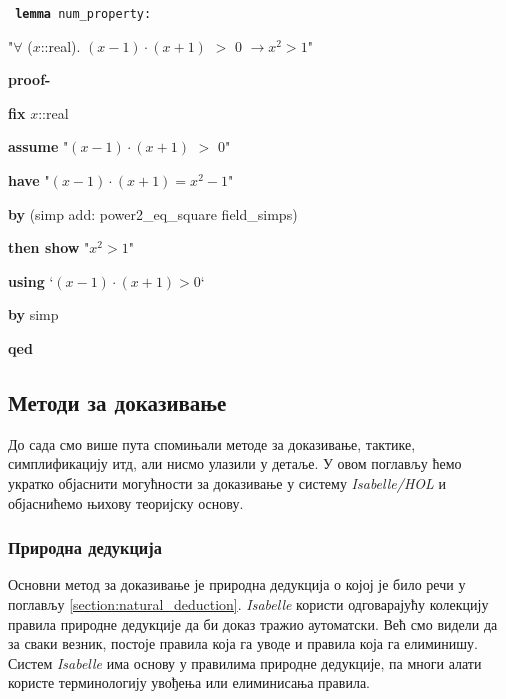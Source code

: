 \smallskip

\begin{small}
{\tt 
\textbf{lemma} num\_property:

  \hspace{0.5cm} "$\forall$ ($x$::real). $(x - 1)\cdot(x + 1)$ $>$ $0$ $\longrightarrow x^2 > 1$"

\textbf{ proof-}

  \hspace{0.5cm} \textbf{fix} $x$::real 

  \hspace{0.5cm} \textbf{assume} "$(x - 1)\cdot (x + 1)$ $>$ $0$"

  \hspace{0.5cm} \textbf{have} "$(x - 1)\cdot(x + 1) = x^2 - 1$"

  \hspace{1cm}   \textbf{by} (simp add: power2\_eq\_square field\_simps)

  \hspace{0.5cm} \textbf{then show} "$x^2 > 1$"

  \hspace{1cm} \textbf{using} `$(x - 1)\cdot(x + 1) > 0$`

  \hspace{1cm} \textbf{by} simp

\textbf{qed}
}
\end{small}

\smallskip


\subsection{Методи за доказивање}

До сада смо више пута спомињали методе за доказивање, тактике,
симплификацију итд, али нисмо улазили у детаље. У овом поглављу ћемо
укратко објаснити могућности за доказивање у систему
\emph{Isabelle/HOL} и објаснићемо њихову теоријску основу.

\subsubsection{Природна дедукција}

Основни метод за доказивање је природна дедукција о којој је било речи
у поглављу \ref{section:natural_deduction}. \emph{Isabelle} користи
одговарајућу колекцију правила природне дедукције да би доказ тражио
аутоматски. Већ смо видели да за сваки везник, постоје правила која га
уводе и правила која га елиминишу. Систем \emph{Isabelle} има основу у
правилима природне дедукције, па многи алати користе терминологију
увођења или елиминисања правила.


